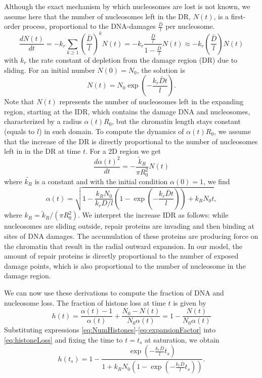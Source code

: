 \documentclass[12pt]{article}
\begin{document}
Although the exact mechanism by which nucleosomes are lost is not known, we assume here that the number of nucleosomes left in the DR, $N(t)$, is a first-order process, proportional to the DNA-damages $\frac{\bar{D}}{l}$ per nucleosome.
\begin{equation*}
\frac{dN(t)}{dt} = -k_r\sum_{k\geq 1} (\frac{\bar{D}}{l})^kN(t)=-k_r \frac{\frac{\bar{D}}{l}}{1-\frac{\bar{D}}{l}}N(t) \approx -k_r (\frac{\bar{D}}{l})N(t)
\end{equation*}
with $k_r$ the rate constant of depletion from the damage region (DR) due to sliding. For an initial number $N(0) = N_0$, the solution is
\begin{equation}\label{eq:NumHistones}
N(t) = N_0\exp(-\frac{k_r\bar{D}t}{l}).
\end{equation}
Note that $N(t)$ represents the number of nucleosomes left in the expanding region, starting at the IDR, which contains the damage DNA and nucleosomes, characterized by a radius $\alpha(t)R_0$, but the chromatin length stays constant (equals to $l$) in such domain. To compute the dynamics of $\alpha(t)R_0$, we assume that the increase of the DR is directly proportional to the number of nucleosomes left in in the DR at time $t$. For a 2D region we get 
\begin{equation}\label{dralpha}
\frac{d\alpha(t)^2}{dt}=-\frac{\tilde{k}_R}{\pi R_0^2}N(t)
\end{equation}
where $\tilde{k_R}$ is a constant and with the initial condition $\alpha(0)=1$, we find 
\begin{equation}\label{eq:expansionFactor}
\alpha(t) = \sqrt{1-\frac{k_RN_0}{k_rD/l}\left(1-\exp(-\frac{k_r\bar{D}t}{l})\right)+k_RN_0t},
\end{equation}
where $k_R = \tilde{k}_R/(\pi R_0^2)$. We interpret the increase IDR as follows: while nucleosomes are sliding outside, repair proteins are invading and then binding at sites of DNA damages. The accumulation of these proteins are producing force on the chromatin that result in the radial outward expansion. In our model, the amount of repair proteins is directly proportional to the number of exposed damage points, which is also proportional to the number of nucleosome in the damage region.

We can now use these derivations to compute the fraction of DNA and nucleosome loss. The fraction of histone loss at time $t$ is given by
\begin{equation}\label{eq:histoneLoss}
h(t) = \frac{\alpha(t)-1}{\alpha(t)} +\frac{N_0-N(t)}{N_0\alpha(t)}=1-\frac{N(t)}{N_0\alpha(t)}
\end{equation}
Substituting expressions \ref{eq:NumHistones}-\ref{eq:expansionFactor} into \ref{eq:histoneLoss} and fixing the time to $t=t_s$ at saturation, we obtain
\begin{equation}\label{eq:totalHistoneLoss}
h(t_s)=1-\frac{\exp(-\frac{k_r\bar{D}}{l}t_s)}{ 1+k_RN_0(1-\exp(-\frac{k_r\bar{D}}{l}t_s))}.
\end{equation}
\end{document}
